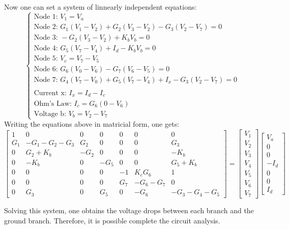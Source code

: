 Now one can set a system of linnearly independent equations:
$$
\begin{cases}
  \text{Node 1: } V_{1} = V_{a}\\
  \text{Node 2: } G_{1}(V_{1}-V_{2})+G_{2}(V_{3}-V_{2})-G_{3}(V_{2}-V_{7}) = 0\\
  \text{Node 3: } -G_{2}(V_{3}-V_{2})+K_bV_{b} = 0\\
  \text{Node 4: } G_{5}(V_{7}-V_{4})+I_{d}-K_bV_{b} = 0\\
  \text{Node 5: } V_{c}=V_{7}-V_{5}\\
  \text{Node 6: } G_{6}(V_{0}-V_{6})-G_{7}(V_{6}-V_{5}) = 0\\
  \text{Node 7: } G_{4}(V_{7}-V_{0})+G_{5}(V_{7}-V_{4})+I_{x}-G_{3}(V_{2}-V_{7}) = 0\\
  \\
  \text{Current x: } I_{x} = I_{d}-I_{c}\\
  \text{Ohm's Law: } I_{c} = G_{6}(0-V_{6})\\
  \text{Voltage b: } V_{b} = V_{2}-V_{7}
\end{cases}
$$
Writing the equations above in matricial form, one gets:
$$
\begin{bmatrix}
  1 & 0 & 0 & 0 & 0 & 0 & 0\\
  G_{1} & -G_{1}-G_{2}-G_{3} & G_{2} & 0 & 0 & 0 & G_{3}\\
  0 & G_{2}+K_{b} & -G_{2} & 0 & 0 & 0 & -K_{b}\\
  0 & -K_{b} & 0 & -G_{5} & 0 & 0 & G_{5}+K_{b}\\
  0 & 0 & 0 & 0 & -1 & K_{c}G_{6} & 1\\
  0 & 0 & 0 & 0 & G_{7} & -G_{6}-G_{7} & 0\\
  0 & G_{3} & 0 & G_{5} & 0 & -G_{6} & -G_{3}-G_{4}-G_{5}
\end{bmatrix}
=
\begin{bmatrix}
  V_{1}\\
  V_{2}\\
  V_{3}\\
  V_{4}\\
  V_{5}\\
  V_{6}\\
  V_{7}
\end{bmatrix}
\begin{bmatrix}
  V_{a}\\
  0\\
  0\\
  -I_{d}\\
  0\\
  0\\
  I_{d}
\end{bmatrix}
$$\par
Solving this system, one obtains the voltage drops between each branch and the ground branch. Therefore, it is possible complete the circuit analysis.

